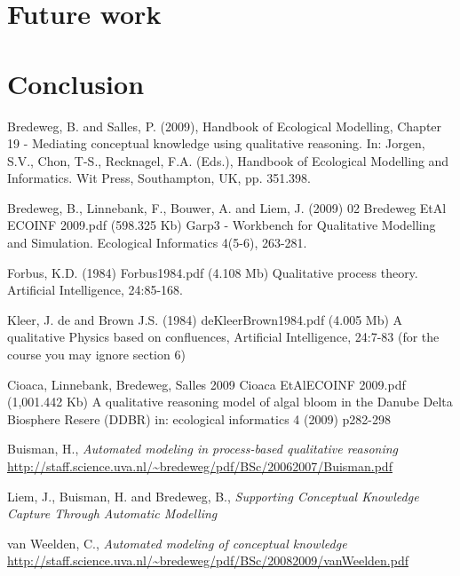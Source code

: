 \documentclass{article}
\begin{document}
\section{Future work}


\section{Conclusion}



\begin{thebibliography}{99}


 Bredeweg, B. and Salles, P. (2009), Handbook of Ecological Modelling, Chapter 19 - Mediating conceptual knowledge using qualitative reasoning. In: J\/orgen, S.V., Chon, T-S., Recknagel, F.A. (Eds.), Handbook of Ecological Modelling and Informatics. Wit Press, Southampton, UK, pp. 351.398.

 Bredeweg, B., Linnebank, F., Bouwer, A. and Liem, J. (2009)
02 Bredeweg EtAl ECOINF 2009.pdf (598.325 Kb)
Garp3 - Workbench for Qualitative Modelling and Simulation. Ecological Informatics 4(5-6), 263-281.

 Forbus, K.D. (1984)
Forbus1984.pdf (4.108 Mb)
Qualitative process theory. Artificial Intelligence, 24:85-168. 

 Kleer, J. de and Brown J.S. (1984)
deKleerBrown1984.pdf (4.005 Mb)
A qualitative Physics based on confluences, Artificial Intelligence, 24:7-83 (for the course you may ignore section 6)

 Cioaca, Linnebank, Bredeweg, Salles 2009
Cioaca EtAlECOINF 2009.pdf (1,001.442 Kb)
A qualitative reasoning model of algal bloom in the Danube Delta Biosphere Resere (DDBR)
in: ecological informatics 4 (2009) p282-298

 Buisman, H., \emph{Automated modeling in process-based qualitative reasoning} \url{http://staff.science.uva.nl/~bredeweg/pdf/BSc/20062007/Buisman.pdf}

 Liem, J., Buisman, H. and Bredeweg, B., \emph{Supporting Conceptual Knowledge Capture Through Automatic Modelling}

 van Weelden, C., \emph{Automated modeling of conceptual knowledge} \url{http://staff.science.uva.nl/~bredeweg/pdf/BSc/20082009/vanWeelden.pdf}

\end{thebibliography}
\end{document}
